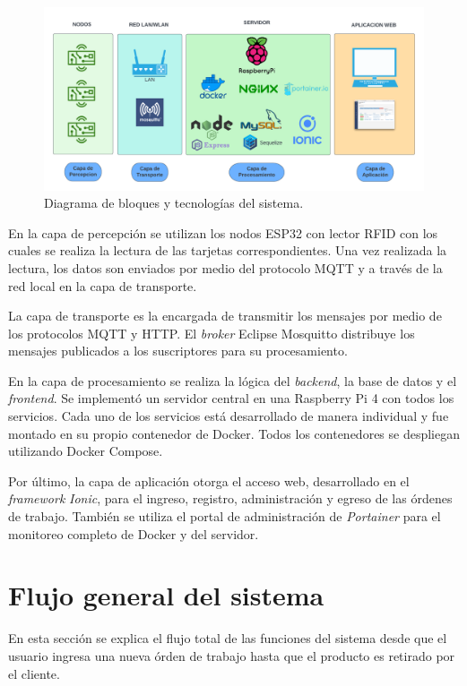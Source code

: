 \begin{figure}[H]
	\centering
	\includegraphics[scale=.25]{./Figures/diagramabloques.png}
	\caption{Diagrama de bloques y tecnologías del sistema.}
	\label{fig:diagramabloques}
\end{figure}


En la capa de percepción se utilizan los nodos ESP32 con lector RFID con los cuales se realiza la lectura de las tarjetas correspondientes. Una vez realizada la lectura, los datos son enviados por medio del protocolo MQTT y a través de la red local en la capa de transporte. 

La capa de transporte es la encargada de transmitir los mensajes por medio de los protocolos MQTT y HTTP. El \textit{broker} Eclipse Mosquitto distribuye los mensajes publicados a los suscriptores para su procesamiento.

En la capa de procesamiento se realiza la lógica del \textit{backend}, la base de datos y el \textit{frontend}. Se implementó un servidor central en una Raspberry Pi 4 con todos los servicios. Cada uno de los servicios está desarrollado de manera individual y fue montado en su propio contenedor de Docker. Todos los contenedores se despliegan utilizando Docker Compose.

Por último, la capa de aplicación otorga el acceso web, desarrollado en el \textit{framework } \textit{Ionic}, para el ingreso, registro, administración y egreso de las órdenes de trabajo. También se utiliza el portal de administración de \textit{Portainer} para el monitoreo completo de Docker y del servidor.


\section{Flujo general del sistema}
\label{sec:flujogeneral}
En esta sección se explica el flujo total de las funciones del sistema desde que el usuario ingresa una nueva órden de trabajo hasta que el producto es retirado por el cliente.

